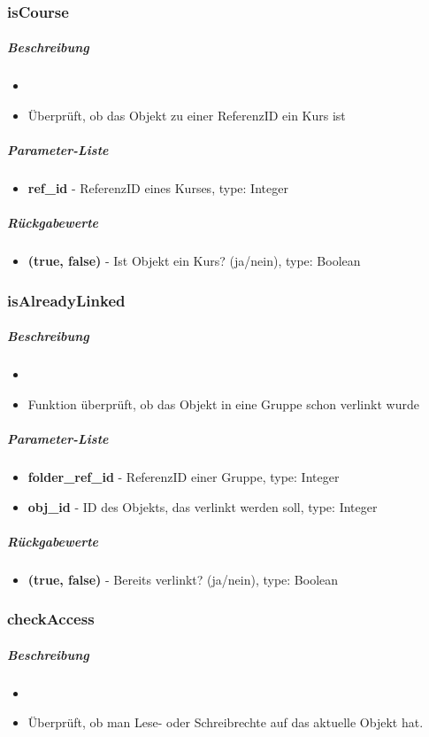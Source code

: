 \subsubsection*{isCourse}\label{isCourseLGUI}
\subparagraph{Beschreibung}
\begin{itemize}
	\item[] \noindent{} 
	\item[] Überprüft, ob das Objekt zu einer ReferenzID ein Kurs ist
\end{itemize}
\subparagraph{Parameter-Liste}
\begin{itemize}
	\item[] \textbf{ref\_id} - ReferenzID eines Kurses, type: Integer
\end{itemize}
\subparagraph{Rückgabewerte}
\begin{itemize}
	\item[] \textbf{(true, false)} - Ist Objekt ein Kurs? (ja/nein), type: Boolean
\end{itemize}

\subsubsection*{isAlreadyLinked}\label{isAlreadyLinkedLGUI}
\subparagraph{Beschreibung}
\begin{itemize}
	\item[] \noindent{} 
	\item[] Funktion überprüft, ob das Objekt in eine Gruppe schon verlinkt wurde
\end{itemize}
\subparagraph{Parameter-Liste}
\begin{itemize}
	\item[] \textbf{folder\_ref\_id} - ReferenzID einer Gruppe, type: Integer
	\item[] \textbf{obj\_id} - ID des Objekts, das verlinkt werden soll, type: Integer
\end{itemize}
\subparagraph{Rückgabewerte}
\begin{itemize}
	\item[] \textbf{(true, false)} - Bereits verlinkt? (ja/nein), type: Boolean
\end{itemize}

\subsubsection*{checkAccess}\label{checkAccessLGUI}
\subparagraph{Beschreibung}
\begin{itemize}
	\item[] \noindent{} 
	\item[] Überprüft, ob man Lese- oder Schreibrechte auf das aktuelle Objekt hat.
\end{itemize}